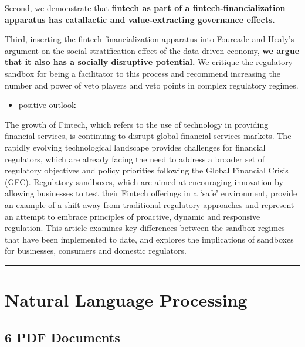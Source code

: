 \documentclass[
]{book}
\providecommand{\tightlist}{%
  \setlength{\itemsep}{0pt}\setlength{\parskip}{0pt}}
\begin{document}
Second, we demonstrate that \textbf{fintech as part of a fintech-financialization apparatus has catallactic and value-extracting governance effects.}

Third, inserting the fintech-financialization apparatus into Fourcade and Healy's argument on the social stratification effect of the data-driven economy, \textbf{we argue that it also has a socially disruptive potential.} We critique the regulatory sandbox for being a facilitator to this process and recommend increasing the number and power of veto players and veto points in complex regulatory regimes.

\begin{itemize}
\tightlist
\item
  positive outlook
\end{itemize}

\citet{bromberg2017fintech}
The growth of Fintech, which refers to the use of technology in providing financial services, is continuing to disrupt global financial services markets. The rapidly evolving technological landscape provides challenges for financial regulators, which are already facing the need to address a broader set of regulatory objectives and policy priorities following the Global Financial Crisis (GFC). Regulatory sandboxes, which are aimed at encouraging innovation by allowing businesses to test their Fintech offerings in a `safe' environment, provide an example of a shift away from traditional regulatory approaches and represent an attempt to embrace principles of proactive, dynamic and responsive regulation. This article examines key differences between the sandbox regimes that have been implemented to date, and explores the implications of sandboxes for businesses, consumers and domestic regulators.

\begin{center}\rule{0.5\linewidth}{0.5pt}\end{center}

\hypertarget{natural-language-processing}{%
\section{Natural Language Processing}\label{natural-language-processing}}

\hypertarget{pdf-documents}{%
\subsection{6 PDF Documents}\label{pdf-documents}}
\end{document}
